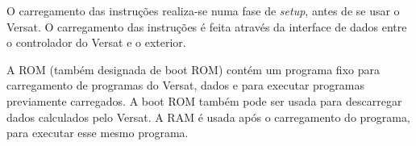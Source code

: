 O carregamento das instruções realiza-se numa fase de {\it setup}, antes de se usar o Versat. O carregamento das instruções é feita através da interface de dados entre o controlador do Versat e o exterior. 

A ROM (também designada de boot ROM) contém um programa fixo para carregamento de programas do Versat, dados e para executar programas previamente carregados. A boot ROM também pode ser usada para descarregar dados calculados pelo Versat. A RAM é usada após o carregamento do programa, para executar esse mesmo programa. 


\cleardoublepage









